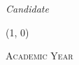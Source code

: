 \begin{titlepage}
\begin{center}
\begin{large}
      \begin{flushright}
        \textit{Candidate}\\
        \vspace{5pt}
        \myName
      \end{flushright}
    \end{large}


    \line(1, 0){\textwidth} \\
    \begin{normalsize}
      \textsc{Academic Year \myAA}
    \end{normalsize}
  \end{center}
\end{titlepage}
